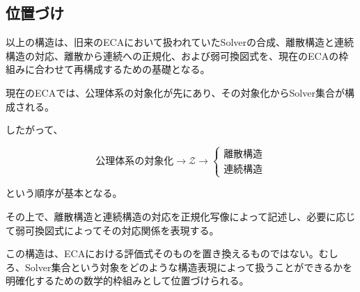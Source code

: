 \subsection{位置づけ}

以上の構造は、旧来のECAにおいて扱われていたSolverの合成、離散構造と連続構造の対応、離散から連続への正規化、および弱可換図式を、現在のECAの枠組みに合わせて再構成するための基礎となる。

現在のECAでは、公理体系の対象化が先にあり、その対象化からSolver集合が構成される。

したがって、

\[
\text{公理体系の対象化}
\longrightarrow
\mathcal{Z}
\longrightarrow
\begin{cases}
\text{離散構造}\\
\text{連続構造}
\end{cases}
\]

という順序が基本となる。

その上で、離散構造と連続構造の対応を正規化写像によって記述し、必要に応じて弱可換図式によってその対応関係を表現する。

この構造は、ECAにおける評価式そのものを置き換えるものではない。むしろ、Solver集合という対象をどのような構造表現によって扱うことができるかを明確化するための数学的枠組みとして位置づけられる。
